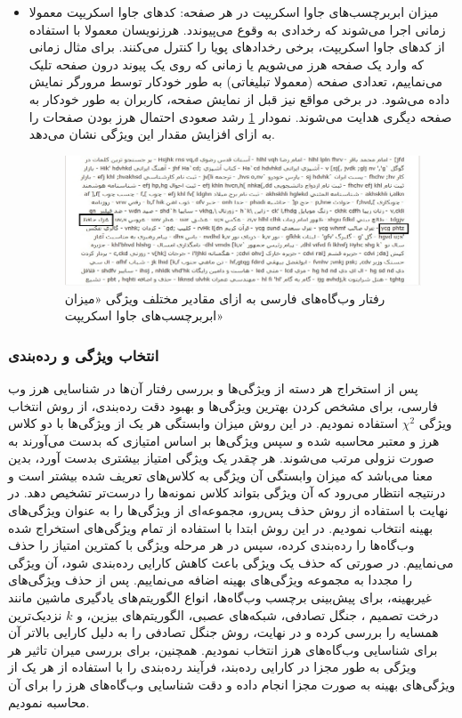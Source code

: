 \documentclass[twoside, a4paper,11pt]{book}
\numberwithin{equation}{chapter}
\numberwithin{table}{chapter}
\numberwithin{figure}{chapter}
\numberwithin{equation}{chapter}
\begin{document}
\begin{itemize}
\begin{figure}
{}
\end{figure}
\item
میزان ابربرچسب‌های جاوا‌ اسکریپت در هر صفحه: کدهای جاوا اسکریپت معمولا زمانی اجرا می‌شوند که رخدادی به وقوع می‌پیوندد. هرزنویسان معمولا با استفاده از کدهای جاوا اسکریپت، برخی رخدادهای پویا را کنترل می‌کنند. برای مثال زمانی که وارد یک صفحه هرز می‌شویم یا زمانی که روی یک پیوند درون صفحه تلیک می‌نماییم، تعدادی صفحه (معمولا تبلیغاتی) به طور خودکار توسط مرورگر نمایش داده می‌شود. در برخی مواقع نیز قبل از نمایش صفحه، کاربران به طور خودکار به صفحه دیگری هدایت می‌شوند. نمودار \ref{fig:plot7} رشد صعودی احتمال هرز بودن صفحات را به ازای افزایش مقدار این ویژگی نشان می‌دهد.
\begin{figure}
\centering
\includegraphics[scale=0.7]{Figures/plot7.png}
\caption{\label{fig:plot7}
رفتار وب‌گاه‌های فارسی به ازای مقادیر مختلف ویژگی «میزان ابربرچسب‌های جاوا اسکریپت» 
}
\end{figure}
\end{itemize}

\subsubsection{انتخاب ویژگی و رده‌بندی}
پس از استخراج هر دسته از ویژگی‌ها و بررسی رفتار آن‌‌ها در شناسایی هرز وب فارسی، برای مشخص کردن بهترین ویژگی‌ها و بهبود دقت رده‌بندی، از روش انتخاب ویژگی  $\chi^2$ استفاده نمودیم. در این روش میزان وابستگی هر یک از ویژگی‌ها با دو کلاس هرز و معتبر محاسبه شده و سپس ویژگی‌ها بر اساس امتیازی که بدست می‌آورند به صورت نزولی مرتب می‌شوند. هر چقدر یک ویژگی امتیاز بیشتری بدست آورد، بدین معنا می‌باشد که میزان وابستگی آن ویژگی به کلاس‌های تعریف شده بیشتر است و درنتیجه انتظار می‌رود که آن ویژگی بتواند کلاس نمونه‌ها را درست‌تر تشخیص دهد. در نهایت با استفاده از روش حذف پس‌رو، مجموعه‌ای از ویژگی‌ها را به عنوان ویژگی‌های بهینه انتخاب نمودیم. در این روش ابتدا با استفاده از تمام ویژگی‌های استخراج شده وب‌گاه‌ها را رده‌بندی کرده، سپس در هر مرحله ویژگی با کمترین امتیاز را حذف می‌نماییم. در صورتی که حذف یک ویژگی باعث کاهش کارایی رده‌بندی شود، آن ویژگی را مجددا به مجموعه ویژگی‌های بهینه اضافه می‌نماییم.
پس از حذف ویژگی‌های غیر‌بهینه، برای پیش‌بینی برچسب وب‌گاه‌ها، انواع الگوریتم‌های یادگیری ماشین مانند درخت تصمیم ، جنگل تصادفی، شبکه‌های عصبی، الگوریتم‌های بیزین،  و $k$ نزدیک‌ترین همسایه را بررسی کرده و در نهایت، روش جنگل تصادفی را به دلیل کارایی بالاتر آن برای شناسایی وب‌گاه‌های هرز انتخاب نمودیم. همچنین، برای بررسی میران تاثیر هر ویژگی به طور مجزا در کارایی رده‌بند، فرآیند رده‌بندی را با استفاده از هر یک از ویژگی‌های بهینه به صورت مجزا انجام داده و دقت شناسایی وب‌گاه‌های هرز را برای آن محاسبه نمودیم.
\end{document}
